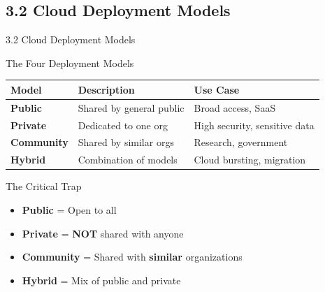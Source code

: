 \documentclass{beamer}
\begin{document}
	\subsection{3.2 Cloud Deployment Models}
	\begin{frame}{3.2 Cloud Deployment Models}
		\begin{block}{The Four Deployment Models}
			\begin{tabular}{|p{2.5cm}|p{4cm}|p{4.5cm}|}
				\hline
				\textbf{Model} & \textbf{Description} & \textbf{Use Case} \\
				\hline
				\textbf{Public} & Shared by general public & Broad access, SaaS \\
				\hline
				\textbf{Private} & Dedicated to one org & High security, sensitive data \\
				\hline
				\textbf{Community} & Shared by similar orgs & Research, government \\
				\hline
				\textbf{Hybrid} & Combination of models & Cloud bursting, migration \\
				\hline
			\end{tabular}
		\end{block}
		
		\begin{alertblock}{The Critical Trap}
			\begin{itemize}
				\item \textbf{Public} = Open to all
				\item \textbf{Private} = \textbf{NOT} shared with anyone
				\item \textbf{Community} = Shared with \textbf{similar} organizations
				\item \textbf{Hybrid} = Mix of public and private
			\end{itemize}
		\end{alertblock}
	\end{frame}
	
\end{document}
